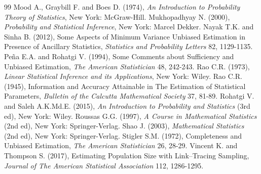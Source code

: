 \documentclass[twoside]{article}
\begin{document}
\begin{thebibliography}{99}
 Mood A., Graybill F. and Boes D. (1974), {\it An Introduction to Probability Theory of Statistics}, New York: McGraw-Hill.
 Mukhopadhyay N. (2000), {\it Probability and Statistical Inference}, New York: Marcel Dekker.
 Nayak T.K. and Sinha B. (2012), Some Aspects of Minimum Variance Unbiased Estimation in Presence of Ancillary Statistics, {\it Statistics and Probability Letters} 82, 1129-1135.
 Pe\~{n}a E.A. and Rohatgi V. (1994), Some Comments about Sufficiency and Unbiased Estimation, {\it The American Statistician} 48, 242-243.
 Rao C.R. (1973), {\it Linear Statistical Inference and its Applications}, New York: Wiley.
 Rao C.R. (1945), Information and Accuracy Attainable in The Estimation of Statistical Parameters, {\it Bulletin of the Calcutta Mathematical Society} 37, 81-89.
 Rohatgi V. and Saleh A.K.Md.E. (2015), {\it An Introduction to Probability and Statistics} (3rd ed), New York: Wiley.
 Roussas G.G. (1997), {\it A Course in Mathematical Statistics} (2nd ed), New York: Springer-Verlag.
 Shao J. (2003), {\it Mathematical Statistics} (2nd ed), New York: Springer-Verlag.
 Stigler S.M. (1972), Completeness and Unbiased Estimation, {\it The American Statistician} 26, 28-29.
 Vincent K. and Thompson S. (2017), Estimating Population Size with Link--Tracing Sampling, {\it Journal of The American Statistical Association} 112, 1286-1295.
\end{thebibliography}

 
\end{document}
